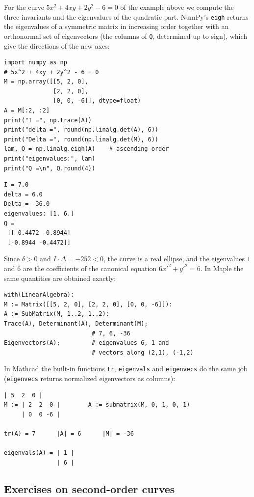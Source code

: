 For the curve $5x^2+4xy+2y^2-6=0$ of the example above we compute the three
invariants and the eigenvalues of the quadratic part. NumPy’s \texttt{eigh}
returns the eigenvalues of a symmetric matrix in increasing order together
with an orthonormal set of eigenvectors (the columns of \texttt{Q}, determined
up to sign), which give the directions of the new axes:
\begin{Verbatim}[fontsize=\footnotesize,frame=single,label={\small Python}]
import numpy as np
# 5x^2 + 4xy + 2y^2 - 6 = 0
M = np.array([[5, 2, 0],
              [2, 2, 0],
              [0, 0, -6]], dtype=float)
A = M[:2, :2]
print("I =", np.trace(A))
print("delta =", round(np.linalg.det(A), 6))
print("Delta =", round(np.linalg.det(M), 6))
lam, Q = np.linalg.eigh(A)    # ascending order
print("eigenvalues:", lam)
print("Q =\n", Q.round(4))
\end{Verbatim}
\begin{Verbatim}[fontsize=\footnotesize,frame=single,label={\small Output}]
I = 7.0
delta = 6.0
Delta = -36.0
eigenvalues: [1. 6.]
Q =
 [[ 0.4472 -0.8944]
 [-0.8944 -0.4472]]
\end{Verbatim}
Since $\delta>0$ and $I\cdot\Delta=-252<0$, the curve is a real ellipse, and
the eigenvalues $1$ and $6$ are the coefficients of the canonical equation
$6x'^2+y'^2=6$. In Maple the same quantities are obtained exactly:
\begin{Verbatim}[fontsize=\footnotesize,frame=single,label={\small Maple}]
with(LinearAlgebra):
M := Matrix([[5, 2, 0], [2, 2, 0], [0, 0, -6]]):
A := SubMatrix(M, 1..2, 1..2):
Trace(A), Determinant(A), Determinant(M);
                         # 7, 6, -36
Eigenvectors(A);         # eigenvalues 6, 1 and
                         # vectors along (2,1), (-1,2)
\end{Verbatim}
In Mathcad the built-in functions \texttt{tr}, \texttt{eigenvals} and
\texttt{eigenvecs} do the same job (\texttt{eigenvecs} returns normalized
eigenvectors as columns):
\begin{Verbatim}[fontsize=\footnotesize,frame=single,label={\small Mathcad}]
     | 5  2  0 |
M := | 2  2  0 |        A := submatrix(M, 0, 1, 0, 1)
     | 0  0 -6 |

tr(A) = 7      |A| = 6      |M| = -36

eigenvals(A) = | 1 |
               | 6 |
\end{Verbatim}

\subsection{Exercises on second-order curves}

